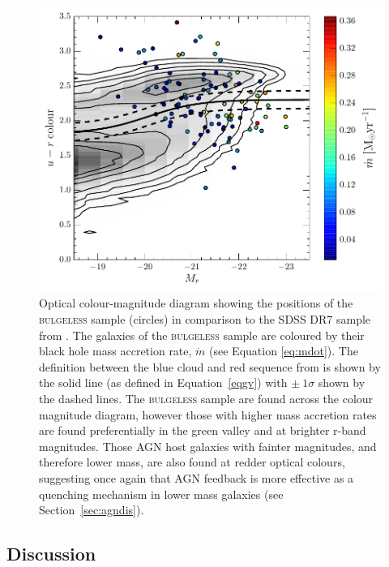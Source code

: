 {\begin{figure}
\centering
\includegraphics[width=\textwidth]{agn/CMD_DISCDOM_coloured_accretion_rate.pdf}
\caption[Colour-magnitude diagram for the \textsc{bulgeless} sample coloured by black hole mass accretion rate]{Optical colour-magnitude diagram showing the positions of the \textsc{bulgeless} sample (circles) in comparison to the SDSS DR7 sample from \citet{Baldry04}. The galaxies of the \textsc{bulgeless} sample are coloured by their black hole mass accretion rate, $\dot{m}$ (see Equation \ref{eq:mdot}). The definition between the blue cloud and red sequence  from \citet{Baldry04} is shown by the solid line (as defined in Equation~\ref{eqgv}) with $\pm~1\sigma$ shown by the dashed lines. The \textsc{bulgeless} sample are found across the colour magnitude diagram, however those with higher mass accretion rates are found preferentially in the green valley and at brighter r-band magnitudes. Those AGN host galaxies with fainter magnitudes, and therefore lower mass, are also found at redder optical colours, suggesting once again that AGN feedback is more effective as a quenching mechanism in lower mass galaxies (see Section~\ref{sec:agndis}).}
\label{fig:cmdmdot}
\end{figure}


%
%  
\subsection{Discussion}\label{sec:intdiscussion}
%
%

}
